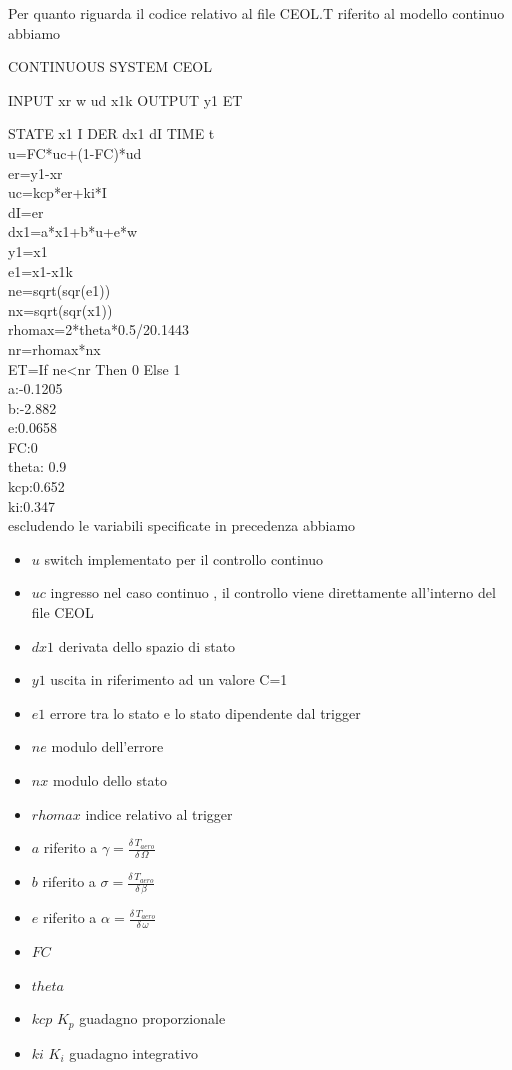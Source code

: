 \documentclass[a4paper,13pt]{article}
\begin{document}
Per quanto riguarda il codice relativo al file CEOL.T riferito al modello continuo abbiamo

CONTINUOUS SYSTEM CEOL


INPUT xr w ud x1k 
OUTPUT y1 ET

STATE x1 I 
DER dx1 dI
TIME t\\
u=FC*uc+(1-FC)*ud \\
er=y1-xr\\
uc=kcp*er+ki*I\\ 
dI=er\\
dx1=a*x1+b*u+e*w\\ 
y1=x1 \\
e1=x1-x1k\\ 
ne=sqrt(sqr(e1))\\ 
nx=sqrt(sqr(x1)) \\
rhomax=2*theta*0.5/20.1443\\
nr=rhomax*nx\\
ET=If ne<nr Then 0 Else 1\\
a:-0.1205\\
b:-2.882\\
e:0.0658\\
FC:0\\
theta: 0.9\\
kcp:0.652\\
ki:0.347\\

escludendo le variabili specificate in precedenza abbiamo
\begin{itemize}
\item $u$      switch implementato per il controllo continuo
\item $uc$     ingresso nel caso continuo , il controllo viene direttamente all'interno del file CEOL
\item $dx1$    derivata dello spazio di stato
\item $y1$     uscita in riferimento ad un valore C=1
\item $e1$     errore tra lo stato e lo stato dipendente dal trigger
\item $ne$     modulo dell'errore
\item $nx$     modulo dello stato
\item $rhomax$ indice relativo al trigger

\item $a$      riferito a $\gamma=\frac{\delta \, T_{aero}}{\delta \, \Omega}$
\item $b$      riferito a $\sigma=\frac{\delta \, T_{aero}}{\delta \, \beta}$
\item $e$      riferito a $\alpha=\frac{\delta \, T_{aero}}{\delta \, \omega}$
\item $FC$
\item $theta$
\item $kcp$    $K_{p}$ guadagno proporzionale
\item $ki$     $K_{i}$ guadagno integrativo
\end{itemize}
\end{document}
